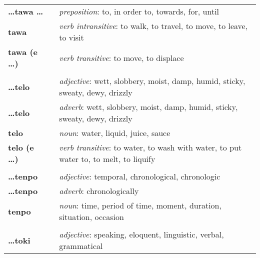 \begin{supertabular}{p{2,5cm}|ll}
    \textbf{\dots tawa \dots}    &  & \textit{preposition}: to, in order to, towards, for, until                                                 \\
    \textbf{tawa}                &  & \textit{verb intransitive}: to walk, to travel, to move, to leave, to visit                                \\
    \textbf{tawa (e \dots)}      &  & \textit{verb transitive}: to move, to displace                                                             \\
                                 &  &                                                                                                            \\ %
    \textbf{\dots telo}          &  & \textit{adjective}: wett, slobbery, moist, damp, humid, sticky, sweaty, dewy, drizzly                      \\
    \textbf{\dots telo}          &  & \textit{adverb}: wett, slobbery, moist, damp, humid, sticky, sweaty, dewy, drizzly                         \\
    \textbf{telo}                &  & \textit{noun}: water, liquid, juice, sauce                                                                 \\
    \textbf{telo (e \dots)}      &  & \textit{verb transitive}: to water, to wash with water, to put water to, to melt, to liquify               \\
                                 &  &                                                                                                            \\ %
    \textbf{\dots tenpo}         &  & \textit{adjective}: temporal, chronological, chronologic                                                   \\
    \textbf{\dots tenpo}         &  & \textit{adverb}: chronologically                                                                           \\
    \textbf{tenpo}               &  & \textit{noun}: time, period of time, moment, duration, situation, occasion                                 \\
                                 &  &                                                                                                            \\ %
    \textbf{\dots toki}          &  & \textit{adjective}: speaking, eloquent, linguistic, verbal, grammatical                                    \\

\end{supertabular}
